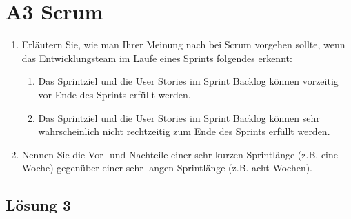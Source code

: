 \documentclass[main.tex]{subfiles}
\begin{document}
\section{A3 Scrum}
\begin{enumerate}
    \item Erläutern Sie, wie man Ihrer Meinung nach bei Scrum vorgehen sollte, wenn das Entwicklungsteam im Laufe eines Sprints folgendes erkennt:
    \begin{enumerate}
        \item Das Sprintziel und die User Stories im Sprint Backlog können vorzeitig vor Ende des Sprints erfüllt werden.
        \item Das Sprintziel und die User Stories im Sprint Backlog können sehr wahrscheinlich nicht rechtzeitig zum Ende des Sprints erfüllt werden.
    \end{enumerate}
    \item Nennen Sie die Vor- und Nachteile einer sehr kurzen Sprintlänge (z.B. eine Woche) gegenüber einer sehr langen Sprintlänge (z.B. acht Wochen).
\end{enumerate}

\subsection{Lösung 3}
\end{document}
